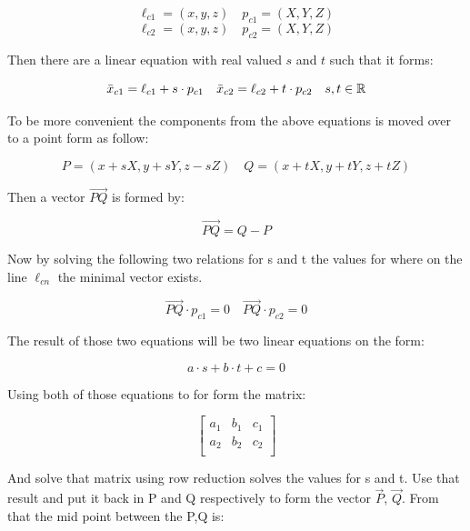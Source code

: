 \begin{equation}
    \ell_{c1} = (x,y,z) \quad p_{c1} = (X,Y,Z)
\end{equation}
\begin{equation}
    \ell_{c2} = (x,y,z) \quad p_{c2} = (X,Y,Z)
\end{equation}

Then there are a linear equation with real valued $s$ and $t$ such that it forms:

\begin{equation}
    \bar x_{c1} = \ell_{c1} + s\cdot p_{c1} \quad \bar x_{c2} = \ell_{c2} + t\cdot p_{c2}\quad s,t\in \mathbb{R}
\end{equation}

To be more convenient the components from the above equations is moved over to a point form as follow:

\begin{equation}
    P = (x+sX, y+sY,z-sZ)\quad
    Q = (x+tX, y+tY,z+tZ)
\end{equation}

Then a vector $\overrightarrow {PQ}$ is formed by:

\begin{equation}
    \overrightarrow {PQ} = Q - P
\end{equation}

Now by solving the following two relations for s and t the values for where on the line $\ell_{cn}$ the minimal vector exists.

\begin{equation}
    \overrightarrow{PQ}\cdot p_{c1}=0 \quad  \overrightarrow{PQ}\cdot p_{c2} = 0
\end{equation}

The result of those two equations will be two linear equations on the form:

\begin{equation}
    a\cdot s + b\cdot t + c = 0
\end{equation}

Using both of those equations to for form the matrix:

\begin{equation}
    \begin{bmatrix}
        a_1 & b_1 & c_1\\
        a_2 & b_2 & c_2\\
    \end{bmatrix}
\end{equation}

And solve that matrix using row reduction solves the values for s and t.
Use that result and put it back in P and Q respectively to form the vector $\overrightarrow{P}$, $\overrightarrow{Q}$.
From that the mid point between the P,Q is:

